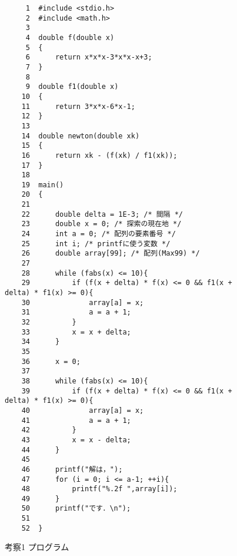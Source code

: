\documentclass[12pt]{jarticle}
\renewcommand  \[  {\begin{eqnarray}}
\renewcommand  \]  {\end{eqnarray}}
\begin{document}
\begin{figure}[t]
\begin{screen}
\footnotesize
\begin{verbatim}
     1	#include <stdio.h>
     2	#include <math.h> 
     3	
     4	double f(double x)
     5	{
     6	    return x*x*x-3*x*x-x+3;
     7	}
     8	
     9	double f1(double x)
    10	{
    11	    return 3*x*x-6*x-1;
    12	}
    13	
    14	double newton(double xk)
    15	{
    16	    return xk - (f(xk) / f1(xk));
    17	}
    18	
    19	main()
    20	{
    21	
    22	    double delta = 1E-3; /* 間隔 */
    23	    double x = 0; /* 探索の現在地 */
    24	    int a = 0; /* 配列の要素番号 */
    25	    int i; /* printfに使う変数 */
    26	    double array[99]; /* 配列(Max99) */
    27	
    28	    while (fabs(x) <= 10){
    29	        if (f(x + delta) * f(x) <= 0 && f1(x + delta) * f1(x) >= 0){
    30	            array[a] = x;
    31	            a = a + 1;
    32	        }
    33	        x = x + delta;
    34	    }
    35	
    36	    x = 0;
    37	
    38	    while (fabs(x) <= 10){
    39	        if (f(x + delta) * f(x) <= 0 && f1(x + delta) * f1(x) >= 0){
    40	            array[a] = x;
    41	            a = a + 1;
    42	        }
    43	        x = x - delta;
    44	    }
    45	
    46	    printf("解は，");
    47	    for (i = 0; i <= a-1; ++i){
    48	        printf("%.2f ",array[i]);
    49	    }
    50	    printf("です．\n");
    51	    
    52	}
\end{verbatim}
\end{screen}
\caption{考察1 プログラム}
\label{fig:3a}
\end{figure}
\end{document}
